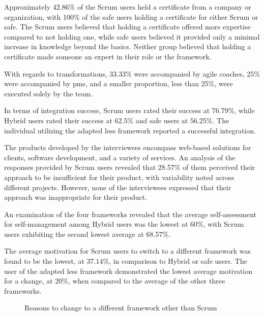 Approximately 42.86\% of the Scrum users held a certificate from a company or organization, with 100\% of the \ac{safe} users holding a certificate for either Scrum or \ac{safe}. The Scrum users believed that holding a certificate offered more expertise compared to not holding one, while \ac{safe} users believed it provided only a minimal increase in knowledge beyond the basics. Neither group believed that holding a certificate made someone an expert in their role or the \gls{framework}. 

With regards to \glspl{transformation}, 33.33\% were accompanied by \gls{agile} coaches, 25\% were accompanied by \acp{pm}, and a smaller proportion, less than 25\%, were executed solely by the team.

In terms of integration success, Scrum users rated their success at 76.79\%, while Hybrid users rated their success at 62.5\% and \ac{safe} users at 56.25\%. The individual utilizing the adapted \ac{less} \gls{framework} reported a successful integration. 

The products developed by the interviewees encompass web-based solutions for \glspl{client}, software development, and a variety of services. An analysis of the responses provided by Scrum users revealed that 28.57\% of them perceived their approach to be insufficient for their product, with variability noted across different projects. However, none of the interviewees expressed that their approach was inappropriate for their product. 

An examination of the four \glspl{framework} revealed that the average self-assessment for self-management among Hybrid users was the lowest at 60\%, with Scrum users exhibiting the second lowest average at 68.57\%. 

The average motivation for Scrum users to switch to a different \gls{framework} was found to be the lowest, at 37.14\%, in comparison to Hybrid or \ac{safe} users. The user of the adapted \ac{less} \gls{framework} demonstrated the lowest average motivation for a change, at 20\%, when compared to the average of the other three \glspl{framework}.

\begin{figure}[!ht]
	\begin{center}
        \caption{Reasons to change to a different framework other than Scrum}\label{fig:reasons-to-change}
    \end{center}
\end{figure}

